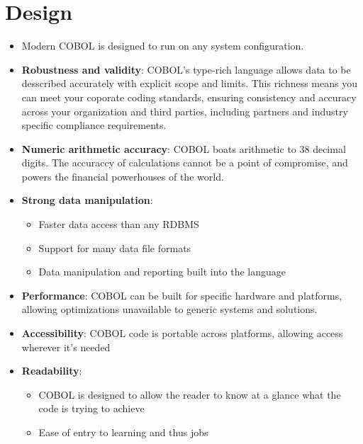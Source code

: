\documentclass[12pt]{article}
\begin{document}
\section{Design}

\begin{itemize}

    \item Modern COBOL is designed to run on any system configuration.
    \item \textbf{Robustness and validity}: COBOL's type-rich language allows data to be desscribed accurately with explicit scope and limits. This richness means you can meet your coporate coding standards, ensuring consistency and accuracy across your organization and third parties, including partners and industry specific compliance requirements.
    \item \textbf{Numeric arithmetic accuracy}: COBOL boats arithmetic to 38 decimal digits. The accuraccy of calculations cannot be a point of compromise, and powers the financial powerhouses of the world.
    \item \textbf{Strong data manipulation}:
    \begin{itemize}
        \item Faster data access than any RDBMS
        \item Support for many data file formats
        \item Data manipulation and reporting built into the language
    \end{itemize}
    \item \textbf{Performance}: COBOL can be built for specific hardware and platforms, allowing optimizations unavailable to generic systems and solutions.
    \item \textbf{Accessibility}: COBOL code is portable across platforms, allowing access wherever it's needed
    \item \textbf{Readability}:
    \begin{itemize}
        \item COBOL is designed to allow the reader to know at a glance what the code is trying to achieve
        \item Ease of entry to learning and thus jobs
    \end{itemize}


\end{itemize}
\end{document}
